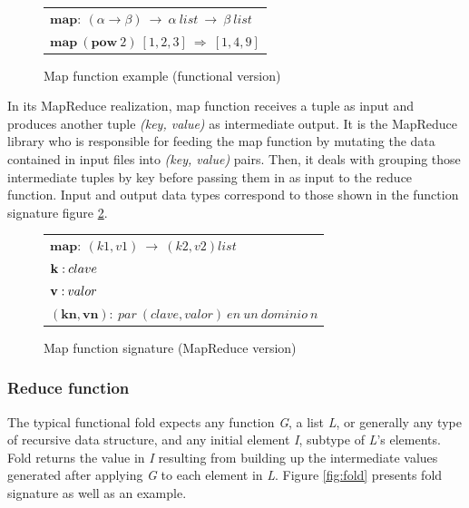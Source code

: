 \begin{figure}[tbp]
\begin{center}
\begin{tabular}{|l|}
\hline
$\mathbf{map:} \: \left ( \alpha \rightarrow \beta \right ) \: \rightarrow \: \alpha \: list \: \rightarrow \: \beta \: list$ \\
$\mathbf{map} \: \left( \mathbf{pow}\:2 \right) \: \left[ 1,2,3 \right] \: \Rightarrow \: \left[ 1,4,9 \right ]$ \\
\hline
\end{tabular}
\caption{Map function example (functional version)}
\label{fig:functionalmap}
\end{center}
\end{figure}

In its MapReduce realization, map function receives a tuple as input and produces another tuple \emph{(key, value)} as intermediate output. It is the MapReduce library who is responsible for feeding the map function by mutating the data contained in input files into \emph{(key, value)} pairs. Then, it deals with grouping those intermediate tuples by key before passing them in as input to the reduce function. Input and output data types correspond to those shown in the function signature figure \ref{fig:mapreducemap}.

\begin{figure}[tbp]
\begin{center}
\begin{tabular}{|l|}
\hline
$\mathbf{map:} \: \left( k1,v1 \right) \: \rightarrow \: \left( k2,v2 \right) list$ \\
$\mathbf{k:} \: clave \linebreak$ \\
$\mathbf{v:} \: valor \linebreak$ \\
$\mathbf{\left(kn,vn \right):} \: par \: \left( clave,valor \right) \: en \: un \: dominio \: n$ \\
\hline
\end{tabular}
\caption{Map function signature (MapReduce version)}
\label{fig:mapreducemap}
\end{center}
\end{figure}


\subsubsection{Reduce function}\label{reduce}

\noindent The typical functional fold expects any function \emph{G}, a list \emph{L}, or generally any type of recursive data structure, and any initial element \emph{I}, subtype of \emph{L}'s elements. Fold returns the value in \emph{I} resulting from building up the intermediate values generated after applying \emph{G} to each element in \emph{L}. Figure \ref{fig:fold} presents fold signature as well as an example.

